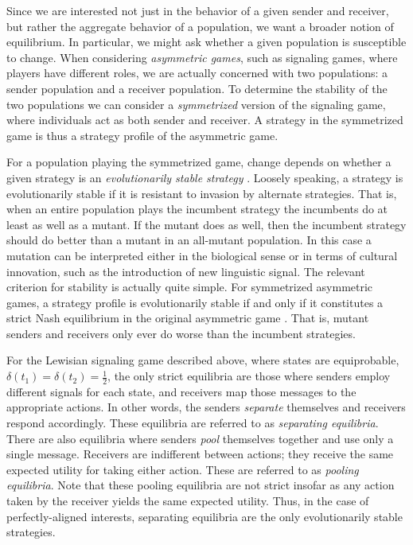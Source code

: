 \documentclass[12pt]{article}
\theoremstyle{definition} \newtheorem{definition}{Definition}
\begin{document}
Since we are interested not just in the behavior of a given sender and receiver, but rather the aggregate behavior of a population, we want a broader notion of equilibrium. In particular, we might ask whether a given population is susceptible to change. When considering \emph{asymmetric games}, such as signaling games, where players have different roles, we are actually concerned with two populations: a sender population and a receiver population. To determine the stability of the two populations we can consider a \emph{symmetrized} version of the signaling game, where individuals act as both sender and receiver. A strategy in the symmetrized game is thus a strategy profile of the asymmetric game.

For a population playing the symmetrized game, change depends on whether a given strategy is an \emph{evolutionarily stable strategy} \citep{maynard-smith-price:1973}. Loosely speaking, a strategy is evolutionarily stable if it is resistant to invasion by alternate strategies. That is, when an entire population plays the incumbent strategy the incumbents do at least as well as a mutant. If the mutant does as well, then the incumbent strategy should do better than a mutant in an all-mutant population.  In this case a mutation can be interpreted either in the biological sense or in terms of cultural innovation, such as the introduction of new linguistic signal. The relevant criterion for stability is actually quite simple. For symmetrized asymmetric games, a strategy profile is  evolutionarily stable if and only if it constitutes a strict Nash equilibrium in the original asymmetric game \citep{selten:1980}. That is, mutant senders and receivers only ever do worse than the incumbent strategies. 

For the Lewisian signaling game described above, where states are equiprobable, $\delta(t_1) = \delta(t_2) = \frac{1}{2}$, the only strict equilibria are those where senders employ different signals for each state, and receivers map those messages to the appropriate actions. In other words, the senders \emph{separate} themselves and receivers respond accordingly. These equilibria are referred to as \emph{separating equilibria}. There are also equilibria where senders \emph{pool} themselves together and use only a single message. Receivers are indifferent between actions; they receive the same expected utility for taking either action. These are referred to as \emph{pooling equilibria}. Note that these pooling equilibria are not strict insofar as any action taken by the receiver yields the same expected utility. Thus, in the case of perfectly-aligned interests, separating equilibria are the only evolutionarily stable strategies.
\end{document}
